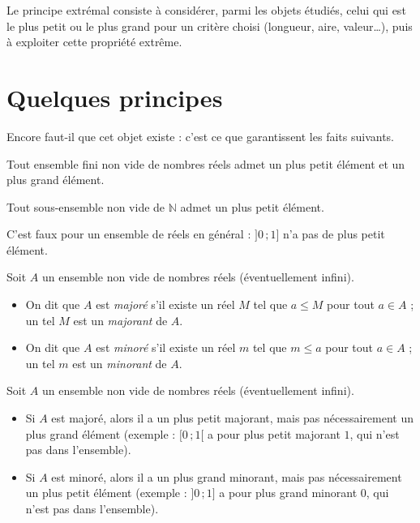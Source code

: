 \documentclass[11pt]{article}
\begin{document}

Le principe extrémal consiste à considérer, parmi les objets étudiés, celui qui est le plus petit ou le plus grand pour un critère choisi (longueur, aire, valeur\ldots), puis à exploiter cette propriété extrême.

\section{Quelques principes}\label{sec:principes}

Encore faut-il que cet objet existe : c'est ce que garantissent les faits suivants.

\begin{proposition}\label{prop:fini}
Tout ensemble fini non vide de nombres réels admet un plus petit élément et un plus grand élément.
\end{proposition}

\begin{proposition}\label{prop:entiers}
Tout sous-ensemble non vide de $\mathbb{N}$ admet un plus petit élément.
\end{proposition}

\begin{remarque}
C'est faux pour un ensemble de réels en général : $]0\,;1]$ n'a pas de plus petit élément.
\end{remarque}

\begin{definition}\label{def:majorant}
Soit $A$ un ensemble non vide de nombres réels (éventuellement infini).
\begin{itemize}
	\item On dit que $A$ est \emph{majoré} s'il existe un réel $M$ tel que $a \leq M$ pour tout $a \in A$ ; un tel $M$ est un \emph{majorant} de $A$.
	\item On dit que $A$ est \emph{minoré} s'il existe un réel $m$ tel que $m \leq a$ pour tout $a \in A$ ; un tel $m$ est un \emph{minorant} de $A$.
\end{itemize}
\end{definition}

\begin{proposition}\label{prop:bornes}
Soit $A$ un ensemble non vide de nombres réels (éventuellement infini).
\begin{itemize}
	\item Si $A$ est majoré, alors il a un plus petit majorant, mais pas nécessairement un plus grand élément (exemple : $[0\,;1[$ a pour plus petit majorant $1$, qui n'est pas dans l'ensemble).
	\item Si $A$ est minoré, alors il a un plus grand minorant, mais pas nécessairement un plus petit élément (exemple : $]0\,;1]$ a pour plus grand minorant $0$, qui n'est pas dans l'ensemble).
\end{itemize}
\end{proposition}
\end{document}
